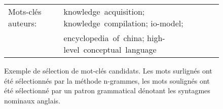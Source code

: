 

\begin{figure*}
    \centering
    
    \begin{tabular}{lp{}}
    Mots-clés auteurs: & \textcolor{mycolor1}{knowledge}~\textcolor{mycolor0}{acquisition}; \textcolor{mycolor1}{knowledge}~compilation; io-model; \\
    & \textcolor{mycolor2}{encyclopedia}~of~china; high-level~conceptual~language \\
    \end{tabular}
    \caption{Exemple de sélection de mot-clés candidats. Les mots surlignés ont été sélectionnés par la méthode n-grammes, les mots soulignés ont été sélectionné par un patron grammatical dénotant les syntagmes nominaux anglais.}
    \label{fig:ex_selection}
\end{figure*}
